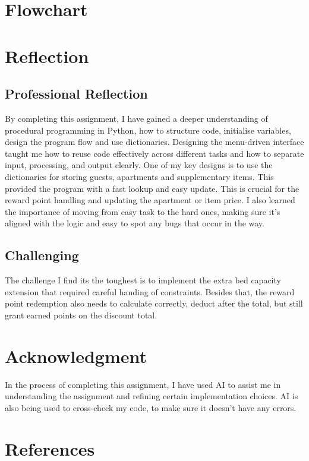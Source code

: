 \documentclass[conference]{IEEEtran}
\begin{document}
\section{Flowchart}

\section{Reflection}
\subsection{Professional Reflection}
By completing this assignment, I have gained a deeper understanding of procedural programming in Python, how to structure code, initialise variables, design the program flow and use dictionaries. Designing the menu-driven interface taught me how to reuse code effectively across different tasks and how to separate input, processing, and output clearly. One of my key designs is to use the dictionaries for storing guests, apartments and supplementary items. This provided the program with a fast lookup and easy update. This is crucial for the reward point handling and updating the apartment or item price. I also learned the importance of moving from easy task to the hard ones, making sure it's aligned with the logic and easy to spot any bugs that occur in the way.
\subsection{Challenging}
The challenge I find its the toughest is to implement the extra bed capacity extension that required careful handing of constraints. Besides that, the reward point redemption also needs to calculate correctly, deduct after the total, but still grant earned points on the discount total.
\section*{Acknowledgment}
In the process of completing this assignment, I have used AI to assist me in understanding the assignment and refining certain implementation choices. AI is also being used to cross-check my code, to make sure it doesn't have any errors. 


\section*{References}



\vspace{12pt}
\end{document}
